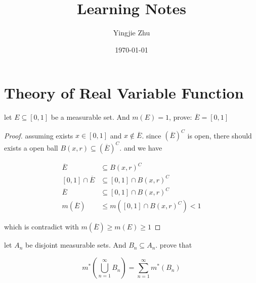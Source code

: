 \documentclass[11pt,a4paper]{article}
\title{Learning Notes}
\author{Yingjie Zhu}
\date{\today}
\begin{document}
\maketitle

\section{Theory of Real Variable Function}

\begin{exercise}
    let $E \subseteq [0,1]$ be a measurable set. And $m(E) = 1$, prove: $\overline{E} = [0,1]$
\end{exercise}

\begin{proof}
    assuming exists $x \in [0,1]$ and $x \notin \overline{E}$. since $\left(\overline{E}\right)^C$ is open, there 
    should exists a open ball $B(x,r) \subseteq \left(\overline{E}\right)^C$. and we have

    \begin{align*}
        \overline{E} & \subseteq B(x,r)^C \\
        [0,1] \cap \overline{E} & \subseteq [0,1] \cap B(x,r)^C \\
        \overline{E} & \subseteq [0,1] \cap B(x,r)^C \\
        m(\overline{E}) & \le m([0,1] \cap B(x,r)^C) < 1
    \end{align*}

    which is contradict with $m(\overline{E}) \ge m(E) \ge 1$
\end{proof}

\begin{exercise}
    let $A_n$ be disjoint measurable sets. And $B_n \subseteq A_n$. prove that

    \[
        m^*(\bigcup_{n=1}^{\infty}B_n) = \sum_{n=1}^{\infty}m^*(B_n)
    \]

\end{exercise}
\end{document}
